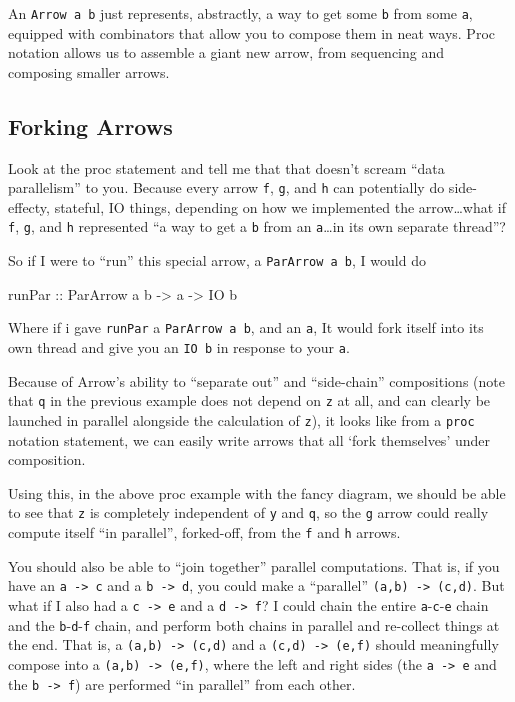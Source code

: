 \documentclass[]{article}
\newenvironment{Shaded}{}{}
\newcommand{\DataTypeTok}[1]{\textcolor[rgb]{0.56,0.13,0.00}{#1}}
\newcommand{\NormalTok}[1]{#1}
\newcommand{\OtherTok}[1]{\textcolor[rgb]{0.00,0.44,0.13}{#1}}
\begin{document}
An \texttt{Arrow\ a\ b} just represents, abstractly, a way to get some
\texttt{b} from some \texttt{a}, equipped with combinators that allow you to
compose them in neat ways. Proc notation allows us to assemble a giant new
arrow, from sequencing and composing smaller arrows.

\subsection{Forking Arrows}\label{forking-arrows}

Look at the proc statement and tell me that that doesn't scream ``data
parallelism'' to you. Because every arrow \texttt{f}, \texttt{g}, and \texttt{h}
can potentially do side-effecty, stateful, IO things, depending on how we
implemented the arrow\ldots what if \texttt{f}, \texttt{g}, and \texttt{h}
represented ``a way to get a \texttt{b} from an \texttt{a}\ldots in its own
separate thread''?

So if I were to ``run'' this special arrow, a \texttt{ParArrow\ a\ b}, I would
do

\begin{Shaded}
\begin{Highlighting}[]
\OtherTok{runPar ::} \DataTypeTok{ParArrow}\NormalTok{ a b }\OtherTok{{-}\textgreater{}}\NormalTok{ a }\OtherTok{{-}\textgreater{}} \DataTypeTok{IO}\NormalTok{ b}
\end{Highlighting}
\end{Shaded}

Where if i gave \texttt{runPar} a \texttt{ParArrow\ a\ b}, and an \texttt{a}, It
would fork itself into its own thread and give you an \texttt{IO\ b} in response
to your \texttt{a}.

Because of Arrow's ability to ``separate out'' and ``side-chain'' compositions
(note that \texttt{q} in the previous example does not depend on \texttt{z} at
all, and can clearly be launched in parallel alongside the calculation of
\texttt{z}), it looks like from a \texttt{proc} notation statement, we can
easily write arrows that all `fork themselves' under composition.

Using this, in the above proc example with the fancy diagram, we should be able
to see that \texttt{z} is completely independent of \texttt{y} and \texttt{q},
so the \texttt{g} arrow could really compute itself ``in parallel'', forked-off,
from the \texttt{f} and \texttt{h} arrows.

You should also be able to ``join together'' parallel computations. That is, if
you have an \texttt{a\ -\textgreater{}\ c} and a \texttt{b\ -\textgreater{}\ d},
you could make a ``parallel'' \texttt{(a,b)\ -\textgreater{}\ (c,d)}. But what
if I also had a \texttt{c\ -\textgreater{}\ e} and a
\texttt{d\ -\textgreater{}\ f}? I could chain the entire
\texttt{a}-\texttt{c}-\texttt{e} chain and the \texttt{b}-\texttt{d}-\texttt{f}
chain, and perform both chains in parallel and re-collect things at the end.
That is, a \texttt{(a,b)\ -\textgreater{}\ (c,d)} and a
\texttt{(c,d)\ -\textgreater{}\ (e,f)} should meaningfully compose into a
\texttt{(a,b)\ -\textgreater{}\ (e,f)}, where the left and right sides (the
\texttt{a\ -\textgreater{}\ e} and the \texttt{b\ -\textgreater{}\ f}) are
performed ``in parallel'' from each other.
\end{document}

